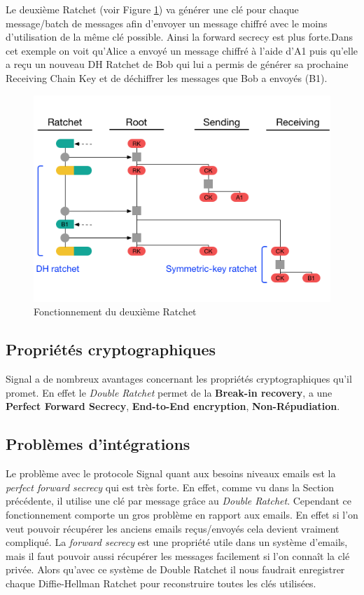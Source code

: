 Le deuxième Ratchet (voir Figure \ref{fig:signalSecond}) va générer une clé pour chaque message/batch de messages afin d'envoyer un message chiffré avec le moins d'utilisation de la même clé possible. Ainsi la forward secrecy est plus forte.Dans cet exemple on voit qu'Alice a envoyé un message chiffré à l'aide d'A1 puis qu'elle a reçu un nouveau DH Ratchet de Bob qui lui a permis de générer sa prochaine Receiving Chain Key et de déchiffrer les messages que Bob a envoyés (B1).

\begin{figure}[h!]
	\centering
	\includegraphics[width=12cm]{images/secondRatchet.png}
	\caption{Fonctionnement du deuxième Ratchet~\cite{doubleratchet}}
	\label{fig:signalSecond}
\end{figure}

\subsection{Propriétés cryptographiques}
Signal a de nombreux avantages concernant les propriétés cryptographiques qu'il promet. En effet le \textit{Double Ratchet} permet de la \textbf{Break-in recovery}, a une \textbf{Perfect Forward Secrecy}, \textbf{End-to-End encryption}, \textbf{Non-Répudiation}.
\subsection{Problèmes d'intégrations}
Le problème avec le protocole Signal quant aux besoins niveaux emails est la \textit{perfect forward secrecy} qui est très forte. En effet, comme vu dans la Section précédente, il utilise une clé par message grâce au \textit{Double Ratchet}. Cependant ce fonctionnement comporte un gros problème en rapport aux emails. En effet si l'on veut pouvoir récupérer les anciens emails reçus/envoyés cela devient vraiment compliqué. La \textit{forward secrecy} est une propriété utile dans un système d'emails, mais il faut pouvoir aussi récupérer les messages facilement si l'on connaît la clé privée. Alors qu'avec ce système de Double Ratchet il nous faudrait enregistrer chaque Diffie-Hellman Ratchet pour reconstruire toutes les clés utilisées.
